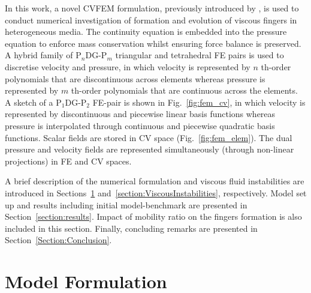 \documentclass[preprint,authoryear,12pt]{elsarticle}
\newcommand{\PN}[2][error]{P$_{#1}$DG-P$_{#2}$}
\begin{document}
\medskip 
In this work, a novel CVFEM formulation, previously introduced by \citet{gomes_2017}\citep[see also][]{jackson_2015,salinas2015}, is used to conduct numerical investigation of formation and evolution of viscous fingers in heterogeneous media. The continuity equation is embedded into the pressure equation to enforce mass conservation whilst ensuring force balance is preserved. A hybrid family of \PN[n]{m} triangular and tetrahedral FE pairs is used to discretise velocity and pressure, in which velocity is represented by $n$ th-order polynomials that are discontinuous across elements whereas pressure is represented by $m$ th-order polynomials that are continuous across the elements. A sketch of a \PN[1]{2} FE-pair is shown in Fig.~\ref{fig:fem_cv}, in which velocity is represented by discontinuous and piecewise linear basis functions whereas pressure is interpolated through continuous and piecewise quadratic basis functions. Scalar fields are stored in CV space (Fig.~\ref{fig:fem_elem}). The dual pressure and velocity fields are represented simultaneously (through non-linear projections) in FE and CV spaces. 
 
\medskip
A brief description of the numerical formulation and viscous fluid instabilities are introduced in Sections~\ref{equations_scheme} and~\ref{section:ViscousInstabilities}, respectively. Model set up and results including initial model-benchmark are presented in Section~\ref{section:results}. Impact of mobility ratio on the fingers formation is also included in this section. Finally, concluding remarks are presented in Section~\ref{Section:Conclusion}.

\section{Model Formulation}\label{equations_scheme}      
\end{document}

